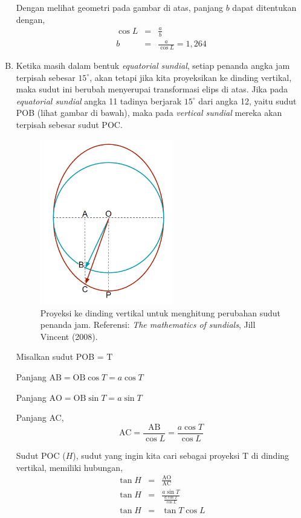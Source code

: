 \documentclass[11pt,fleqn]{exam}
\begin{document}
\begin{questions}
\begin{enumerate}[A.]
Dengan melihat geometri pada gambar di atas, panjang $b$ dapat ditentukan dengan,
\begin{eqnarray*}
    \cos{L} &=& \frac{a}{b}\\
    b &=& \frac{a}{\cos{L}} = 1,264 
\end{eqnarray*}

\item Ketika masih dalam bentuk \textit{equatorial sundial}, setiap penanda angka jam terpisah sebesar $15^{\circ}$, akan tetapi jika kita proyeksikan ke dinding vertikal, maka sudut ini berubah menyerupai transformasi elips di atas. Jika pada \textit{equatorial sundial} angka 11 tadinya berjarak $15^{\circ}$ dari angka 12, yaitu sudut POB (lihat gambar di bawah), maka pada \textit{vertical sundial} mereka akan terpisah sebesar sudut POC.
\begin{figure}[H]
\centering
\includegraphics[width=0.55\textwidth]{sundialmath2.png}
\captionsetup{labelformat=empty}
\caption{Proyeksi ke dinding vertikal untuk menghitung perubahan sudut penanda jam. Referensi: \textit{The mathematics of sundials}, Jill Vincent (2008).}
\label{fig:sundialmath2}
\end{figure}
Misalkan sudut POB = T

Panjang $\text{AB} = \text{OB} \cos{T} = a \cos{T}$ 

Panjang $\text{AO} = \text{OB} \sin{T} = a \sin{T}$

Panjang AC,
$$\text{AC} = \frac{\text{AB}}{\cos{L}} = \frac{a \cos{T}}{\cos{L}}$$

Sudut POC ($H$), sudut yang ingin kita cari sebagai proyeksi T di dinding vertikal, memiliki hubungan,
\begin{eqnarray*}
    \tan{H} &=& \frac{\text{AO}}{\text{AC}}\\
    \tan{H} &=& \frac{a \sin{T}}{\frac{a \cos{T}}{\cos{L}}}\\
    \tan{H} &=& \tan{T} \cos{L}
\end{eqnarray*}


\end{enumerate}
\end{questions}
\end{document}
